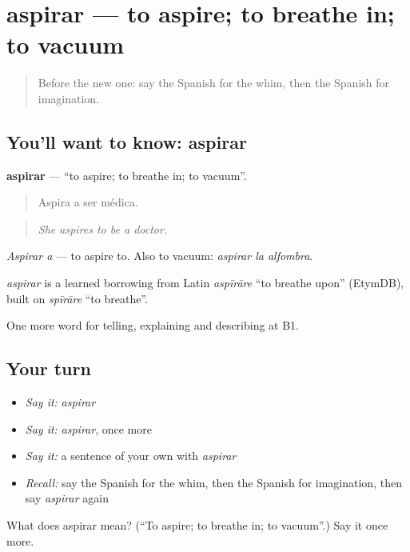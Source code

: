\section[aspirar]{aspirar — to aspire; to breathe in; to vacuum}

\label{lesson:ES-C765-aspirar}



\begin{quote}
Before the new one: say the Spanish for the whim, then the Spanish for imagination.
\end{quote}

\subsection*{You'll want to know: aspirar}
\textbf{aspirar} — \textquotedblleft{}to aspire; to breathe in; to vacuum\textquotedblright{}.

\begin{quote}
Aspira a ser médica.
\end{quote}

\begin{quote}
\emph{She aspires to be a doctor.}
\end{quote}

\emph{Aspirar a} — to aspire to. Also to vacuum: \emph{aspirar la alfombra}.

\begin{cousinweb}
\emph{aspirar} is a learned borrowing from Latin \emph{aspīrāre} \textquotedblleft{}to breathe upon\textquotedblright{} (EtymDB), built on \emph{spīrāre} \textquotedblleft{}to breathe\textquotedblright{}.
\end{cousinweb}

\begin{grammarlens}[title={What you've built}]
One more word for telling, explaining and describing at B1.
\end{grammarlens}

\subsection*{Your turn}
\begin{itemize}
\raggedright
  \item \emph{Say it:} \emph{aspirar}
  \item \emph{Say it:} \emph{aspirar}, once more
  \item \emph{Say it:} a sentence of your own with \emph{aspirar}
  \item \emph{Recall:} say the Spanish for the whim, then the Spanish for imagination, then say \emph{aspirar} again
\end{itemize}

\begin{tcolorbox}[breakable,colback=teal!4,colframe=teal!35!black,title={Before you move on}]
What does aspirar mean? (\textquotedblleft{}To aspire; to breathe in; to vacuum\textquotedblright{}.) Say it once more.
\end{tcolorbox}
